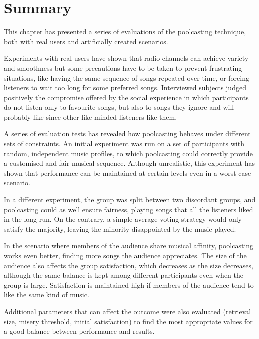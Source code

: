 

\section{Summary} %
\label{sec:contributions8}

This chapter has presented a series of evaluations of the poolcasting technique, both with real users and artificially created scenarios.

Experiments with real users have shown that radio channels can achieve variety and smoothness but some precautions have to be taken to prevent frustrating situations, like having the same sequence of songs repeated over time, or forcing listeners to wait too long for some preferred songs.
Interviewed subjects judged positively the compromise offered by the social experience in which participants do not listen only to favourite songs, but also to songs they ignore and will probably like since other like-minded listeners like them.

A series of evaluation tests has revealed how poolcasting behaves under different sets of constraints.
An initial experiment was run on a set of participants with random, independent music profiles, to which poolcasting could correctly provide a customised and fair musical sequence.
%
Although unrealistic, this experiment has shown that performance can be maintained at certain levels even in a worst-case scenario.

In a different experiment, the group was split between two discordant groups, and poolcasting could as well ensure fairness, playing songs that all the listeners liked in the long run.
On the contrary, a simple average voting strategy would only satisfy the majority, leaving the minority disappointed by the music played.

In the scenario where members of the audience share musical affinity, poolcasting works even better, finding more songs the audience appreciates. 
The size of the audience also affects the group satisfaction, which decreases as the size decreases, although the same balance is kept among different participants even when the group is large.
Satisfaction is maintained high if members of the audience tend to like the same kind of music.

Additional parameters that can affect the outcome were also evaluated (retrieval size, misery threshold, initial satisfaction) to find the most appropriate values for a good balance between performance and results.

